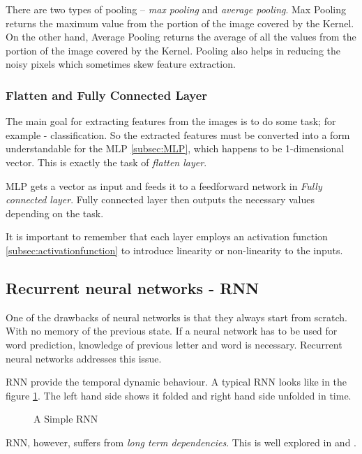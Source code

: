 There are two types of pooling -- \textit{max pooling} and \textit{average pooling}. Max Pooling
returns the maximum value from the portion of the image covered by the Kernel.
On the other hand, Average Pooling returns the average of all the values
from the portion of the image covered by the Kernel. Pooling also helps in reducing the
noisy pixels which sometimes skew feature extraction.

\subsubsection*{Flatten and Fully Connected Layer}
The main goal for extracting features from the images is to do some task; for example -
classification. So the extracted features must be converted into a form understandable for
the MLP \ref{subsec:MLP}, which happens to be 1-dimensional vector. This is exactly the
task of \textit{flatten layer}.

MLP gets a vector as input and feeds it to a feedforward network in \textit{Fully
connected layer}. Fully connected layer then outputs the necessary values depending on the
task.

It is important to remember that each layer employs an activation function
\ref{subsec:activationfunction} to introduce linearity or non-linearity to the inputs.

\subsection{Recurrent neural networks - RNN}
One of the drawbacks of neural networks is that they always start from scratch. With no
memory of the previous state. If a neural network has to be used for word prediction,
knowledge of previous letter and word is necessary. Recurrent neural networks addresses
this issue.

RNN provide the temporal dynamic behaviour. A typical RNN looks like in the figure
\ref{fig:RNN}. The left hand side shows it folded and right hand side unfolded in time.
\begin{figure}[h]
	\centering
        \def\svgwidth{0.7\textwidth}
\begin{tiny}
        
\end{tiny}
    \caption{A Simple RNN}
    \label{fig:RNN}
\end{figure}
RNN, however, suffers from \textit{long term dependencies}. This is well explored in
\cite{RNNdrawback1} and \cite{RNNdrawback2}.

